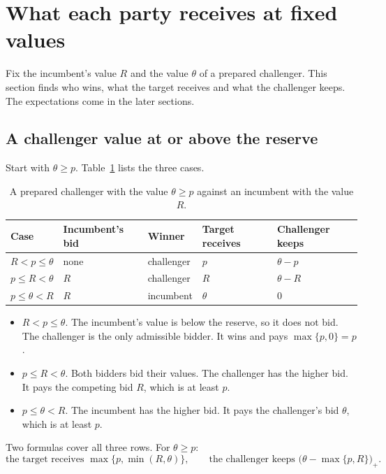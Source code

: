 \section{What each party receives at fixed values}\label{sec:auction-outcomes}

Fix the incumbent's value \(R\) and the value \(\theta\) of a prepared challenger. This section finds who wins,
what the target receives and what the challenger keeps. The expectations come in the later sections.

\subsection*{A challenger value at or above the reserve}

Start with \(\theta\ge p\). Table~\ref{tab:auction-cases} lists the three cases.

\begin{table}[htbp]
\centering\small
\caption{A prepared challenger with the value \(\theta\ge p\) against an incumbent with the value \(R\).}
\label{tab:auction-cases}
\begin{tabular}{@{}lllll@{}}
\toprule
Case & Incumbent's bid & Winner & Target receives & Challenger keeps\\
\midrule
\(R<p\le\theta\) & none & challenger & \(p\) & \(\theta-p\)\\
\(p\le R<\theta\) & \(R\) & challenger & \(R\) & \(\theta-R\)\\
\(p\le\theta<R\) & \(R\) & incumbent & \(\theta\) & \(0\)\\
\bottomrule
\end{tabular}
\end{table}

\begin{itemize}
\item \(R<p\le\theta\). The incumbent's value is below the reserve, so it does not bid. The challenger is the
only admissible bidder. It wins and pays \(\max\{p,0\}=p\).
\item \(p\le R<\theta\). Both bidders bid their values. The challenger has the higher bid. It pays the competing
bid \(R\), which is at least \(p\).
\item \(p\le\theta<R\). The incumbent has the higher bid. It pays the challenger's bid \(\theta\), which is at
least \(p\).
\end{itemize}

Two formulas cover all three rows. For \(\theta\ge p\):
\[
\text{the target receives }\max\{p,\min(R,\theta)\},\qquad
\text{the challenger keeps }\bigl(\theta-\max\{p,R\}\bigr)_+.
\]

